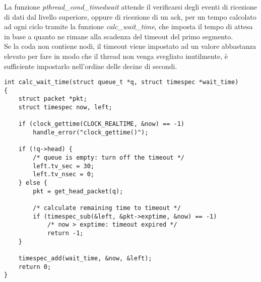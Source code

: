 La funzione \emph{pthread\_cond\_timedwait} attende il verificarsi degli 
eventi di ricezione di dati dal livello superiore, oppure di ricezione di
un ack, per un tempo calcolato ad ogni ciclo tramite la funzione
\emph{calc\_wait\_time}, che imposta il tempo di attesa in base a quanto 
ne rimane alla scadenza del timeout del primo segmento.\\
Se la coda non contiene nodi, il timeout viene impostato ad un valore
abbastanza elevato per fare in modo che il thread non venga svegliato 
inutilmente, è sufficiente impostarlo nell'ordine delle decine di secondi.
\begin{lstlisting}[title=transport.c]
int calc_wait_time(struct queue_t *q, struct timespec *wait_time)
{
    struct packet *pkt;
    struct timespec now, left;

    if (clock_gettime(CLOCK_REALTIME, &now) == -1)
        handle_error("clock_gettime()");

    if (!q->head) {
        /* queue is empty: turn off the timeout */
        left.tv_sec = 30;
        left.tv_nsec = 0;
    } else {
        pkt = get_head_packet(q);

        /* calculate remaining time to timeout */
        if (timespec_sub(&left, &pkt->exptime, &now) == -1)
            /* now > exptime: timeout expired */
            return -1;
    }

    timespec_add(wait_time, &now, &left);
    return 0;
}
\end{lstlisting}
